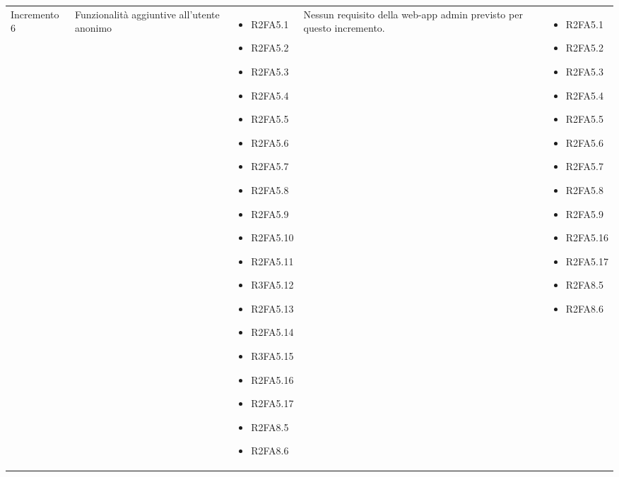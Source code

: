 {\begin{longtable}{C{2.5cm} C{3.2cm} C{2.8cm} C{2.8cm} C{2.8cm}}
Incremento 6 & Funzionalità aggiuntive all'utente anonimo & \begin{itemize}
    \item[ ] R2FA5.1
    \item[ ] R2FA5.2
    \item[ ] R2FA5.3
    \item[ ] R2FA5.4
    \item[ ] R2FA5.5
    \item[ ] R2FA5.6
    \item[ ] R2FA5.7
    \item[ ] R2FA5.8
    \item[ ] R2FA5.9
    \item[ ] R2FA5.10
    \item[ ] R2FA5.11
    \item[ ] R3FA5.12
    \item[ ] R2FA5.13
    \item[ ] R2FA5.14
    \item[ ] R3FA5.15
    \item[ ] R2FA5.16
    \item[ ] R2FA5.17
    \item[ ] R2FA8.5
    \item[ ] R2FA8.6
\end{itemize} &
    Nessun requisito della web-app admin previsto per questo incremento. 
    & \begin{itemize} 
    \item[ ] R2FA5.1
    \item[ ] R2FA5.2
    \item[ ] R2FA5.3
    \item[ ] R2FA5.4
    \item[ ] R2FA5.5
    \item[ ] R2FA5.6
    \item[ ] R2FA5.7
    \item[ ] R2FA5.8
    \item[ ] R2FA5.9
    \item[ ] R2FA5.16
    \item[ ] R2FA5.17
    \item[ ] R2FA8.5
    \item[ ] R2FA8.6
\end{itemize}\\


\end{longtable}}
